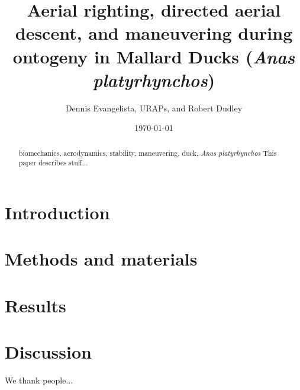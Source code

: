 \documentclass{rspublic}
\newcommand{\Anasplatyrhynchos}{\emph{Anas platyrhynchos}}
\begin{document}
\title[Maneuvering during ontogeny in Mallard Ducks]{Aerial righting, directed aerial descent, and maneuvering during ontogeny in Mallard Ducks (\Anasplatyrhynchos)}
\author[D. Evangelista \emph{et. al}]{Dennis Evangelista, URAPs, and Robert Dudley}
\date{\today}
\label{firstpage}
\maketitle


\begin{abstract}{biomechanics, aerodynamics, stability, maneuvering, duck, \Anasplatyrhynchos}
This paper describes stuff...  
\end{abstract}




\section{Introduction}

\section{Methods and materials}

\section{Results}

\section{Discussion}

\begin{acknowledgements}
We thank people...
\end{acknowledgements}


\label{lastpage}
\end{document}
